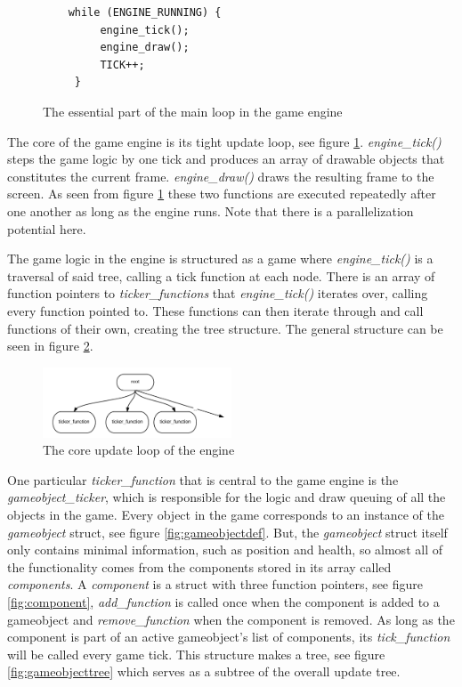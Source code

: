 \documentclass[a4paper,12pt]{article}
\begin{document}
\begin{figure}[h]
\centering
\begin{verbatim}
    while (ENGINE_RUNNING) {
         engine_tick();
         engine_draw();
         TICK++;
     }
\end{verbatim}
\caption{The essential part of the main loop in the game engine}
\label{fig:mainloop}
\end{figure}

The core of the game engine is its tight update loop, see figure \ref{fig:mainloop}. \emph{engine\_tick()} steps the game logic by one tick and produces an array of drawable objects that constitutes the current frame. \emph{engine\_draw()} draws the resulting frame to the screen. As seen from figure \ref{fig:mainloop} these two functions are executed repeatedly after one another as long as the engine runs. Note that there is a parallelization potential here.

The game logic in the engine is structured as a game where \emph{engine\_tick()} is a traversal of said tree, calling a tick function at each node. There is an array of function pointers to \emph{ticker\_functions} that \emph{engine\_tick()} iterates over, calling every function pointed to. These functions can then iterate through and call functions of their own, creating the tree structure. The general structure can be seen in figure \ref{fig:enginecore}.

\begin{figure}
\centering
\includegraphics[width=0.5\textwidth]{general_engine}
\caption{The core update loop of the engine}
\label{fig:enginecore}
\end{figure}

One particular \emph{ticker\_function} that is central to the game engine is the \emph{gameobject\_ticker}, which is responsible for the logic and draw queuing of all the objects in the game. Every object in the game corresponds to an instance of the \emph{gameobject} struct, see figure \ref{fig:gameobjectdef}. But, the \emph{gameobject} struct itself only contains minimal information, such as position and health, so almost all of the functionality comes from the components stored in its array called \emph{components}. A \emph{component} is a struct with three function pointers, see figure \ref{fig:component}, \emph{add\_function} is called once when the component is added to a gameobject and \emph{remove\_function} when the component is removed. As long as the component is part of an active gameobject’s list of components, its \emph{tick\_function} will be called every game tick. This structure makes a tree, see figure \ref{fig:gameobjecttree} which serves as a subtree of the overall update tree.
\end{document}
